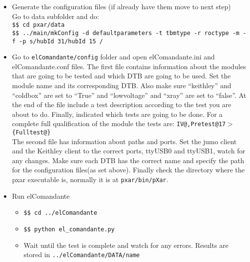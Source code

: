 \documentclass[12pt]{unlsilabsop}
\makeatletter
\newcommand{\at}{\makeatletter @\makeatother}
\makeatother
\begin{document}
\begin{enumerate}
\begin{itemize}
		\item Generate the configuration files (if already have them move to next step)\\
		Go to data subfolder and do:\\
		\texttt{\$\$ cd pxar/data}\\
		\texttt{\$\$ ../main/mkConfig -d defaultparameters -t tbmtype -r roctype -m -f -p \textsc{}s/hubId 31/hubId 15 	\textsc{}/}
		\item Go to \texttt{elComandante/config} folder and open elComandante.ini and elComandante.conf files. The first file contains information about the modules that are going to be tested and which DTB are going to be used. Set the module name and its corresponding DTB. Also make sure ``keithley'' and ``coldbox'' are set to ``True'' and ``lowvoltage'' and ``xray'' are set to ``false''. At the end of the file include a test description according to the test you are about to do. Finally, indicated which tests are going to be done. For a complete full qualification of the module the tests are: \texttt{IV\at 17,Pretest{\at}17$>$\{Fulltest\at 17\}}\\

		The second file has information about paths and ports. Set the jumo client and the Keithley client to the correct ports, ttyUSB0 and ttyUSB1, watch for any changes. Make sure each DTB has the correct name and specify the path for the configuration files(as set above). Finally check the directory where the pxar executable is, normally it is at \texttt{pxar/bin/pXar}.
		\item Run elComandante
		\begin{itemize}
			\item \texttt{\$\$ cd ../elComandante}
			\item \texttt{\$\$ python el\_comandante.py}
			\item Wait until the test is complete and watch for any errors. Results are stored in \texttt{../elComandante/DATA/name}
		\end{itemize}
	\end{itemize}
   

\end{enumerate}
\end{document}
